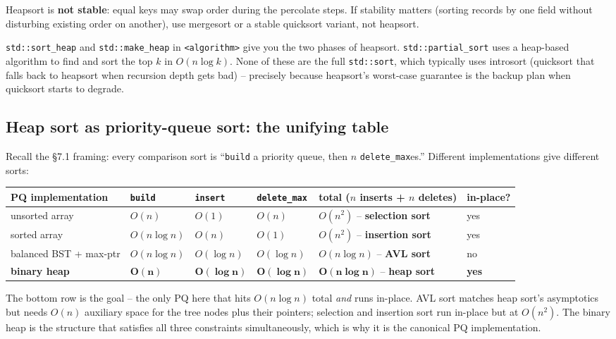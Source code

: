 \documentclass[11pt]{article}
\begin{document}
\begin{warnbox}
Heapsort is \textbf{not stable}: equal keys may swap order during the percolate steps. If stability matters (sorting records by one field without disturbing existing order on another), use mergesort or a stable quicksort variant, not heapsort.
\end{warnbox}

\begin{notebox}
\texttt{std::sort\_heap} and \texttt{std::make\_heap} in \texttt{<algorithm>} give you the two phases of heapsort. \texttt{std::partial\_sort} uses a heap-based algorithm to find and sort the top $k$ in $O(n \log k)$. None of these are the full \texttt{std::sort}, which typically uses introsort (quicksort that falls back to heapsort when recursion depth gets bad) -- precisely because heapsort's worst-case guarantee is the backup plan when quicksort starts to degrade.
\end{notebox}

\subsection*{Heap sort as priority-queue sort: the unifying table}

Recall the \S7.1 framing: every comparison sort is ``\texttt{build} a
priority queue, then $n$ \texttt{delete\_max}es.'' Different
implementations give different sorts:

\begin{center}
\begin{tabular}{lllll|l}
PQ implementation & \texttt{build} & \texttt{insert} & \texttt{delete\_max} & total ($n$ inserts + $n$ deletes) & in-place? \\
\hline
unsorted array          & $O(n)$ & $O(1)$       & $O(n)$       & $O(n^2)$  -- \textbf{selection sort} & yes \\
sorted array            & $O(n \log n)$ & $O(n)$       & $O(1)$       & $O(n^2)$  -- \textbf{insertion sort} & yes \\
balanced BST + max-ptr  & $O(n \log n)$ & $O(\log n)$  & $O(\log n)$  & $O(n \log n)$ -- \textbf{AVL sort} & no \\
\textbf{binary heap}    & $\mathbf{O(n)}$ & $\mathbf{O(\log n)}$ & $\mathbf{O(\log n)}$ & $\mathbf{O(n \log n)}$ -- \textbf{heap sort} & \textbf{yes} \\
\end{tabular}
\end{center}

The bottom row is the goal -- the only PQ here that hits $O(n \log n)$
total \emph{and} runs in-place. AVL sort matches heap sort's
asymptotics but needs $O(n)$ auxiliary space for the tree nodes plus
their pointers; selection and insertion sort run in-place but at
$O(n^2)$. The binary heap is the structure that satisfies all three
constraints simultaneously, which is why it is the canonical PQ
implementation.
\end{document}
